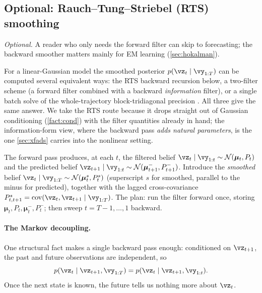 \documentclass[11pt]{article}
\theoremstyle{plain}
\theoremstyle{definition}
\theoremstyle{remark}
\theoremstyle{definition}
\newcommand{\Normal}{\mathcal{N}}
\newcommand{\vmu}{\bm{\mu}}
\begin{document}
\subsection{Optional: Rauch--Tung--Striebel (RTS) smoothing}

\emph{Optional.} A reader who only needs the forward filter can skip to
forecasting; the backward smoother matters mainly for EM learning
(\cref{sec:hokalman}).

For a linear-Gaussian model the smoothed posterior $p(\vz_t\mid\vy_{1:T})$ can be
computed several equivalent ways: the RTS backward recursion below, a two-filter
scheme (a forward filter combined with a backward \emph{information} filter), or a
single batch solve of the whole-trajectory block-tridiagonal precision
\parencite{Sarkka2013-bfs}. All three give the same answer. We take the RTS route
because it drops straight out of Gaussian conditioning (\cref{fact:cond}) with the
filter quantities already in hand; the information-form view, where the backward
pass \emph{adds natural parameters}, is the one \cref{sec:xfads} carries into the
nonlinear setting.

The forward pass produces, at each $t$, the filtered belief $\vz_t \mid \vy_{1:t}
\sim \Normal(\vmu_t, P_t)$ and the predicted belief $\vz_{t+1} \mid \vy_{1:t} \sim
\Normal(\vmu_{t+1}^-, P_{t+1}^-)$. Introduce the \emph{smoothed} belief $\vz_t
\mid \vy_{1:T} \sim \Normal(\vmu_t^s, P_t^s)$ (superscript $s$ for smoothed,
parallel to the minus for predicted), together with the lagged cross-covariance
$P_{t,t+1}^s = \cov(\vz_t, \vz_{t+1} \mid \vy_{1:T})$. The plan: run the filter
forward once, storing $\vmu_t, P_t, \vmu_t^-, P_t^-$; then sweep $t = T-1, \dots,
1$ backward.

\paragraph{The Markov decoupling.} One structural fact makes a single backward
pass enough: conditioned on $\vz_{t+1}$, the past and future observations are
independent, so
\begin{equation}\label{eq:sm-markov}
    p(\vz_t \mid \vz_{t+1}, \vy_{1:T}) = p(\vz_t \mid \vz_{t+1}, \vy_{1:t}) .
\end{equation}
Once the next state is known, the future tells us nothing more about $\vz_t$.
\end{document}
